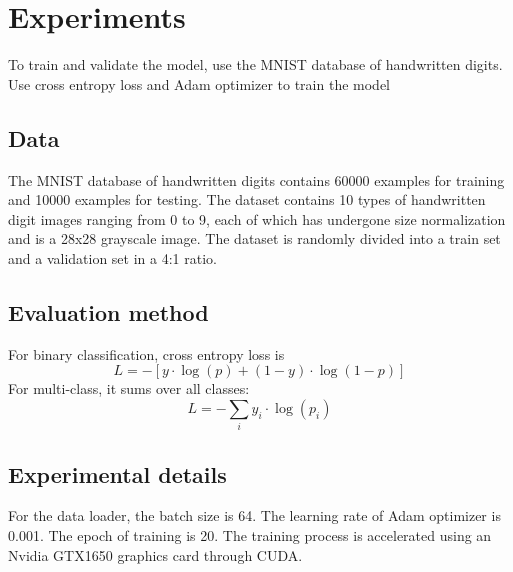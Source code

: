 \documentclass{article}
\begin{document}
\section{Experiments}
To train and validate the model, use the MNIST database of handwritten digits. Use cross entropy loss and Adam optimizer to train the model
\subsection{Data}
The MNIST database of handwritten digits contains 60000 examples for training and 10000 examples for testing.
The dataset contains 10 types of handwritten digit images ranging from 0 to 9, each of which has undergone size normalization and is a 28x28 grayscale image.
The dataset is randomly divided into a train set and a validation set in a 4:1 ratio.
\subsection{Evaluation method}
For binary classification, cross entropy loss is 
$$L = - [ y \cdot \log(p) + (1 - y) \cdot \log(1 - p) ]$$
For multi-class, it sums over all classes:
$$L = - \sum_{i} y_i \cdot \log(p_i)$$

\subsection{Experimental details}
For the data loader, the batch size is 64. The learning rate of Adam optimizer is 0.001. The epoch of training is 20.
The training process is accelerated using an Nvidia GTX1650 graphics card through CUDA.
\end{document}

